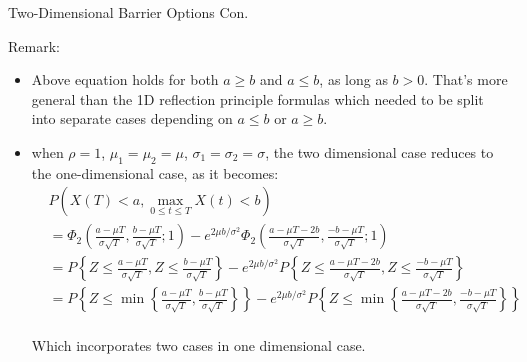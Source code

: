 \documentclass{beamer}
\begin{document}
\begin{frame}{Two-Dimensional Barrier Options Con.}
    
    {\footnotesize \footnotesize
    \par Remark:
    \begin{itemize}
        \item Above equation holds for both \( a \geq b \) and \( a \leq b \), as long as \( b > 0 \).
        That's more general than the 1D reflection principle formulas which needed to be split into 
        separate cases depending on $a \leq b$ or $a \geq b$. 
        \item when \( \rho = 1 \), \( \mu_1 = \mu_2 = \mu \), \( \sigma_1 = \sigma_2 = \sigma \), 
        the two dimensional case reduces to the one-dimensional case, as it becomes:
        {\footnotesize \scriptsize
        \begin{align*}
        &P\left(X(T) < a, \max_{0 \leq t \leq T} X(t) < b\right) \\
        &= \Phi_2 \left( \frac{a - \mu T}{\sigma \sqrt{T}}, \frac{b - \mu T}{\sigma \sqrt{T}}; 1 \right) - e^{2\mu b / \sigma^2} \Phi_2 \left( \frac{a - \mu T - 2b}{\sigma \sqrt{T}}, \frac{-b - \mu T}{\sigma \sqrt{T}}; 1 \right) \\
        &= P \left\{ Z \leq \frac{a - \mu T}{\sigma \sqrt{T}}, Z \leq \frac{b - \mu T}{\sigma \sqrt{T}} \right\}
         - e^{2\mu b / \sigma^2} P \left\{ Z \leq \frac{a - \mu T - 2b}{\sigma \sqrt{T}}, Z \leq \frac{-b - \mu T}{\sigma \sqrt{T}} \right\}\\
        &=P \left\{ Z \leq \min\left\{\frac{a - \mu T}{\sigma \sqrt{T}}, \frac{b - \mu T}{\sigma \sqrt{T}}\right\} \right\}
         - e^{2\mu b / \sigma^2} P \left\{ Z \leq \min\left\{\frac{a - \mu T - 2b}{\sigma \sqrt{T}},\frac{-b - \mu T}{\sigma \sqrt{T}}\right\}  \right\}\\
        \end{align*}
        }
        \par Which incorporates two cases in one dimensional case.
    \end{itemize}
    }

\end{frame}
\end{document}
